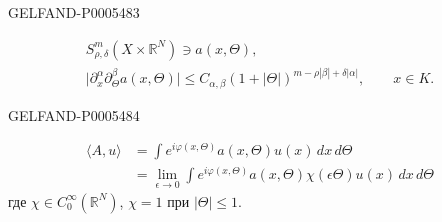 \begin{GelfandAdjacentEvidence}{GELFAND-P000548}{3}

\begin{gather*}
S_{\rho,\delta}^m(X\times\mathbb R^N)\ni a(x,\Theta),\\
\bigl|\partial_x^\alpha\partial_\Theta^\beta a(x,\Theta)\bigr|
\le C_{\alpha,\beta}(1+|\Theta|)^{m-\rho|\beta|+\delta|\alpha|},
\qquad x\in K.
\end{gather*}
\end{GelfandAdjacentEvidence}
\begin{GelfandAdjacentEvidence}{GELFAND-P000548}{4}

\begin{align*}
\langle A,u\rangle&=\int e^{i\varphi(x,\Theta)}a(x,\Theta)u(x)\,dx\,d\Theta\\
&=\lim_{\epsilon\to0}\int e^{i\varphi(x,\Theta)}
a(x,\Theta)\chi(\epsilon\Theta)u(x)\,dx\,d\Theta
\end{align*}
где \(\chi\in C_0^\infty(\mathbb R^N)\), \(\chi=1\) при \(|\Theta|\le1\).
\end{GelfandAdjacentEvidence}



